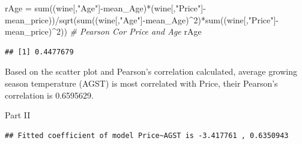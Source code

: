 \documentclass[
]{article}
\newenvironment{Shaded}{\begin{snugshade}}{\end{snugshade}}
\newcommand{\AttributeTok}[1]{\textcolor[rgb]{0.77,0.63,0.00}{#1}}
\newcommand{\CommentTok}[1]{\textcolor[rgb]{0.56,0.35,0.01}{\textit{#1}}}
\newcommand{\DecValTok}[1]{\textcolor[rgb]{0.00,0.00,0.81}{#1}}
\newcommand{\FunctionTok}[1]{\textcolor[rgb]{0.00,0.00,0.00}{#1}}
\newcommand{\NormalTok}[1]{#1}
\newcommand{\OtherTok}[1]{\textcolor[rgb]{0.56,0.35,0.01}{#1}}
\newcommand{\SpecialCharTok}[1]{\textcolor[rgb]{0.00,0.00,0.00}{#1}}
\newcommand{\StringTok}[1]{\textcolor[rgb]{0.31,0.60,0.02}{#1}}
\begin{document}
\begin{Shaded}
\begin{Highlighting}[]
\NormalTok{rAge }\OtherTok{=} \FunctionTok{sum}\NormalTok{((wine[,}\StringTok{"Age"}\NormalTok{]}\SpecialCharTok{{-}}\NormalTok{mean\_Age)}\SpecialCharTok{*}\NormalTok{(wine[,}\StringTok{"Price"}\NormalTok{]}\SpecialCharTok{{-}}\NormalTok{mean\_price))}\SpecialCharTok{/}\FunctionTok{sqrt}\NormalTok{(}\FunctionTok{sum}\NormalTok{((wine[,}\StringTok{"Age"}\NormalTok{]}\SpecialCharTok{{-}}\NormalTok{mean\_Age)}\SpecialCharTok{\^{}}\DecValTok{2}\NormalTok{)}\SpecialCharTok{*}\FunctionTok{sum}\NormalTok{((wine[,}\StringTok{"Price"}\NormalTok{]}\SpecialCharTok{{-}}\NormalTok{mean\_price)}\SpecialCharTok{\^{}}\DecValTok{2}\NormalTok{)) }\CommentTok{\# Pearson Cor Price and Age}
\NormalTok{rAge}
\end{Highlighting}
\end{Shaded}

\begin{verbatim}
## [1] 0.4477679
\end{verbatim}

Based on the scatter plot and Pearson's correlation calculated, average
growing season temperature (AGST) is most correlated with Price, their
Pearson's correlation is 0.6595629.

Part II

\begin{Shaded}
\end{Shaded}

\begin{verbatim}
## Fitted coefficient of model Price~AGST is -3.417761 , 0.6350943
\end{verbatim}

\begin{Shaded}
\end{Shaded}
\end{document}
